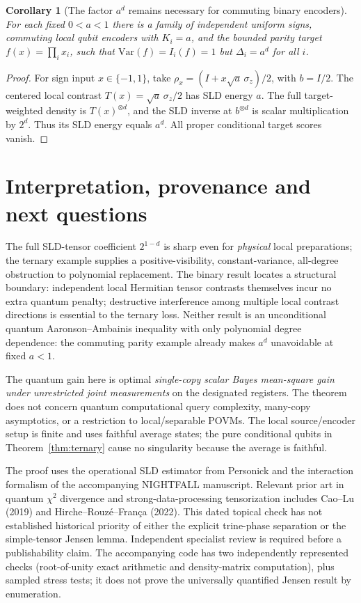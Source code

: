 \documentclass[11pt]{article}
\newtheorem{corollary}{Corollary}
\begin{document}
\begin{corollary}[The factor $a^d$ remains necessary for commuting binary encoders]
For each fixed $0<a<1$ there is a family of independent uniform signs, commuting local qubit encoders with $K_i=a$, and the bounded parity target $f(x)=\prod_i x_i$, such that $\mathrm{Var}(f)=I_i(f)=1$ but $\Delta_i=a^d$ for all $i$.
\end{corollary}
\begin{proof}
For sign input $x\in\{-1,1\}$, take $\rho_x=(I+x\sqrt a\,\sigma_z)/2$, with $b=I/2$. The centered local contrast $T(x)=\sqrt a\,\sigma_z/2$ has SLD energy $a$. The full target-weighted density is $T(x)^{\otimes d}$, and the SLD inverse at $b^{\otimes d}$ is scalar multiplication by $2^d$. Thus its SLD energy equals $a^d$. All proper conditional target scores vanish.
\end{proof}

\section{Interpretation, provenance and next questions}
The full SLD-tensor coefficient $2^{1-d}$ is sharp even for \emph{physical} local preparations; the ternary example supplies a positive-visibility, constant-variance, all-degree obstruction to polynomial replacement. The binary result locates a structural boundary: independent local Hermitian tensor contrasts themselves incur no extra quantum penalty; destructive interference among multiple local contrast directions is essential to the ternary loss. Neither result is an unconditional quantum Aaronson--Ambainis inequality with only polynomial degree dependence: the commuting parity example already makes $a^d$ unavoidable at fixed $a<1$.

The quantum gain here is optimal \emph{single-copy scalar Bayes mean-square gain under unrestricted joint measurements} on the designated registers. The theorem does not concern quantum computational query complexity, many-copy asymptotics, or a restriction to local/separable POVMs. The local source/encoder setup is finite and uses faithful average states; the pure conditional qubits in Theorem~\ref{thm:ternary} cause no singularity because the average is faithful.

The proof uses the operational SLD estimator from Personick and the interaction formalism of the accompanying NIGHTFALL manuscript. Relevant prior art in quantum $\chi^2$ divergence and strong-data-processing tensorization includes Cao--Lu (2019) and Hirche--Rouz\'e--Fran\c ca (2022). This dated topical check has not established historical priority of either the explicit trine-phase separation or the simple-tensor Jensen lemma. Independent specialist review is required before a publishability claim. The accompanying code has two independently represented checks (root-of-unity exact arithmetic and density-matrix computation), plus sampled stress tests; it does not prove the universally quantified Jensen result by enumeration.
\end{document}
